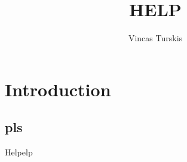 \documentclass[11pt,a4paper]{report}
\author{Vincas Turskis}
\title{HELP}
\begin{document}
\tableofcontents
\chapter{Introduction}
\section{pls}
Helpelp
\end{document}
